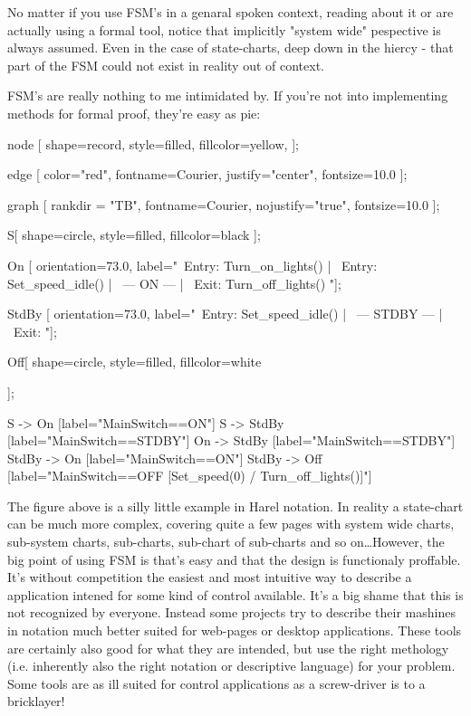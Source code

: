 No matter if you use FSM's in a genaral spoken context, reading about it or are actually using a formal tool, notice that implicitly "system wide" pespective is always assumed. Even in the case of state-charts, deep down in the hiercy - that part of the FSM could not exist in reality out of context.

FSM's are really nothing to me intimidated by. If you're not into implementing methods for formal proof, they're easy as pie:

\begin{dotpic}
   node [
      shape=record,
      style=filled,
      fillcolor=yellow,
   ];

   edge [
      color="red",
      fontname=Courier,
      justify="center",
      fontsize=10.0
   ];

   graph [
      rankdir = "TB",
      fontname=Courier,
      nojustify="true",
      fontsize=10.0
   ];

   S[
      shape=circle,
      style=filled,
      fillcolor=black
   ];

   On [ orientation=73.0, label="{\
     Entry:  Turn_on_lights()       | \
     Entry:  Set_speed_idle()       | \	
      --- ON ---  | \
     Exit:  Turn_off_lights() }"];

   StdBy [ orientation=73.0, label="{\
     Entry:  Set_speed_idle()       | \
      --- STDBY ---  | \
     Exit: }"];

   Off[
      shape=circle,
      style=filled,
      fillcolor=white

   ];
   

    S -> On    [label="MainSwitch==ON"]
    S -> StdBy [label="MainSwitch==STDBY"]
    On -> StdBy [label="MainSwitch==STDBY"]
    StdBy -> On [label="MainSwitch==ON"]
    StdBy -> Off [label="MainSwitch==OFF [Set_speed(0) / Turn_off_lights()]"]

\end{dotpic}
 
The figure above is a silly little example in Harel notation. In reality a state-chart can be much more complex, covering quite a few pages with system wide charts, sub-system charts, sub-charts, sub-chart of sub-charts and so on\ldots However, the big point of using FSM is that's easy and that the design is functionaly proffable. It's without competition the easiest and most intuitive way to describe a application intened for some kind of control available. It's a big shame that this is not recognized by everyone. Instead some projects try to describe their mashines in notation much better suited for web-pages or desktop applications. These tools are certainly also good for what they are intended, but use the right methology (i.e. inherently also the right notation or descriptive language) for your problem. Some tools are as ill suited for control applications as a screw-driver is to a bricklayer!

